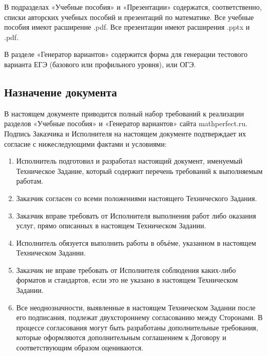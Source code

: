 В подразделах «Учебные пособия» и «Презентации» содержатся, соответственно, списки авторских учебных пособий и презентаций по математике. Все учебные пособия имеют расширение .pdf. Все презентации имеют расширения .pptx и .pdf.

В разделе «Генератор вариантов» содержится форма для генерации тестового варианта ЕГЭ (базового или профильного уровня), или ОГЭ.

\subsection{Назначение документа}
В настоящем документе приводится полный набор требований к реализации разделов «Учебные пособия» и «Генератор вариантов» сайта mathperfect.ru.
Подпись Заказчика и Исполнителя на настоящем документе подтверждает их согласие с нижеследующими фактами и условиями:
\begin{enumerate}
  \item Исполнитель подготовил и разработал настоящий документ, именуемый Техническое Задание, который содержит перечень требований к выполняемым работам.
  \item Заказчик согласен со всеми положениями настоящего Технического Задания.
  \item Заказчик вправе требовать от Исполнителя выполнения работ либо оказания услуг, прямо описанных в настоящем Техническом Задании.
  \item Исполнитель обязуется выполнить работы в объёме, указанном в настоящем Техническом Задании.
  \item Заказчик не вправе требовать от Исполнителя соблюдения каких-либо форматов и стандартов, если это не указано в настоящем Техническом Задании.
  \item Все неоднозначности, выявленные в настоящем Техническом Задании после его подписания, подлежат двухстороннему согласованию между Сторонами. В процессе согласования могут быть разработаны дополнительные требования, которые оформляются дополнительным соглашением к Договору и соответствующим образом оцениваются.
\end{enumerate}

